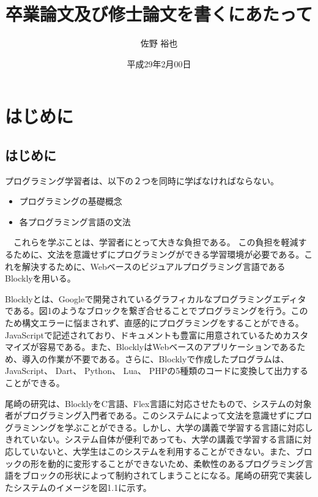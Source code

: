 \documentclass{eniepaper}
\title {卒業論文及び修士論文を書くにあたって}
\author{佐野 裕也}
\date{平成29年2月00日}
\begin{document}
 
\maketitle
                                                          
   \chapter{はじめに}
   
   \section{はじめに}


  プログラミング学習者は、以下の２つを同時に学ばなければならない。
  
\begin{itemize}
\item プログラミングの基礎概念
\item 各プログラミング言語の文法
\end{itemize} 

　これらを学ぶことは、学習者にとって大きな負担である。
 この負担を軽減するために、文法を意識せずにプログラミングができる学習環境が必要である。これを解決するために、Webベースのビジュアルプログラミング言語であるBlocklyを用いる。
  
Blocklyとは、Googleで開発されているグラフィカルなプログラミングエディタである。図1のようなブロックを繋ぎ合せることでプログラミングを行う。このため構文エラーに悩まされず、直感的にプログラミングをすることができる。JavaScriptで記述されており、ドキュメントも豊富に用意されているためカスタマイズが容易である。また、BlocklyはWebベースのアプリケーションであるため、導入の作業が不要である。さらに、Blocklyで作成したプログラムは、JavaScript、 Dart、 Python、 Lua、 PHPの5種類のコードに変換して出力することができる。

\newpage
 
尾崎の研究は、BlocklyをC言語、Flex言語に対応させたもので、システムの対象者がプログラミング入門者である。このシステムによって文法を意識せずにプログラミンングを学ぶことができる。しかし、大学の講義で学習する言語に対応しきれていない。システム自体が便利であっても、大学の講義で学習する言語に対応していないと、大学生はこのシステムを利用することができない。また、ブロックの形を動的に変形することができないため、柔軟性のあるプログラミング言語をブロックの形状によって制約されてしまうことになる。尾崎の研究で実装したシステムのイメージを図1.1に示す。
 
\end{document}
